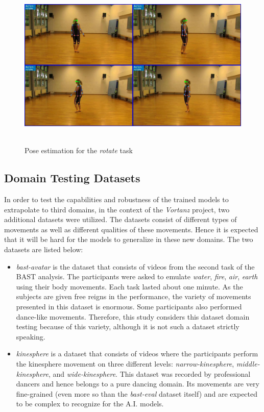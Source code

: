 \documentclass[extern,palatino]{cgMA}
\begin{document}
\bigskip
\begin{figure}[h]
\center
\includegraphics[height={230pt}, width={370pt}]{Thesis/images/rotate_pose.jpg}
\caption{Pose estimation for the \textit{rotate} task}
\label{rotate_pose}
\end{figure}

\newpage
\subsection{Domain Testing Datasets}
\label{domain_testing_dataset}
In order to test the capabilities and robustness of the trained models to extrapolate to third domains, in the context of the \textit{Vortanz} project, two additional datasets were utilized. The datasets consist of different types of movements as well as different qualities of these movements. Hence it is expected that it will be hard for the models to generalize in these new domains. The two datasets are listed below:

\begin{itemize}
    \item \textit{bast-avatar} is the dataset that consists of videos from the second task of the BAST analysis. The participants were asked to emulate \textit{water}, \textit{fire}, \textit{air}, \textit{earth} using their body movements. Each task lasted about one minute. As the subjects are given free reigns in the performance, the variety of movements presented in this dataset is enormous. Some participants also performed dance-like movements. Therefore, this study considers this dataset domain testing because of this variety, although it is not such a dataset strictly speaking.
    
    \item \textit{kinesphere} is a dataset that consists of videos where the participants perform the kinesphere movement on three different levels: \textit{narrow-kinesphere}, \textit{middle-kinesphere}, and \textit{wide-kinesphere}. This dataset was recorded by professional dancers and hence belongs to a pure dancing domain. Its movements are very fine-grained (even more so than the \textit{bast-eval} dataset itself) and are expected to be complex to recognize for the A.I. models.
\end{itemize}
\end{document}
